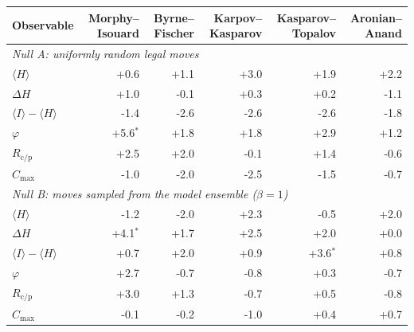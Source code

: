 \begin{tabular}{lrrrrr}
\toprule
Observable & Morphy--Isouard & Byrne--Fischer & Karpov--Kasparov & Kasparov--Topalov & Aronian--Anand \\
\midrule
\multicolumn{6}{l}{\emph{Null A: uniformly random legal moves}} \\
$\langle H\rangle$ & +0.6 & +1.1 & +3.0 & +1.9 & +2.2 \\
$\Delta H$ & +1.0 & -0.1 & +0.3 & +0.2 & -1.1 \\
$\langle I\rangle-\langle H\rangle$ & -1.4 & -2.6 & -2.6 & -2.6 & -1.8 \\
$\varphi$ & +5.6$^{*}$ & +1.8 & +1.8 & +2.9 & +1.2 \\
$R_{\mathrm{c/p}}$ & +2.5 & +2.0 & -0.1 & +1.4 & -0.6 \\
$C_{\max}$ & -1.0 & -2.0 & -2.5 & -1.5 & -0.7 \\
\midrule
\multicolumn{6}{l}{\emph{Null B: moves sampled from the model ensemble ($\beta=1$)}} \\
$\langle H\rangle$ & -1.2 & -2.0 & +2.3 & -0.5 & +2.0 \\
$\Delta H$ & +4.1$^{*}$ & +1.7 & +2.5 & +2.0 & +0.0 \\
$\langle I\rangle-\langle H\rangle$ & +0.7 & +2.0 & +0.9 & +3.6$^{*}$ & +0.8 \\
$\varphi$ & +2.7 & -0.7 & -0.8 & +0.3 & -0.7 \\
$R_{\mathrm{c/p}}$ & +3.0 & +1.3 & -0.7 & +0.5 & -0.8 \\
$C_{\max}$ & -0.1 & -0.2 & -1.0 & +0.4 & +0.7 \\
\bottomrule
\end{tabular}
